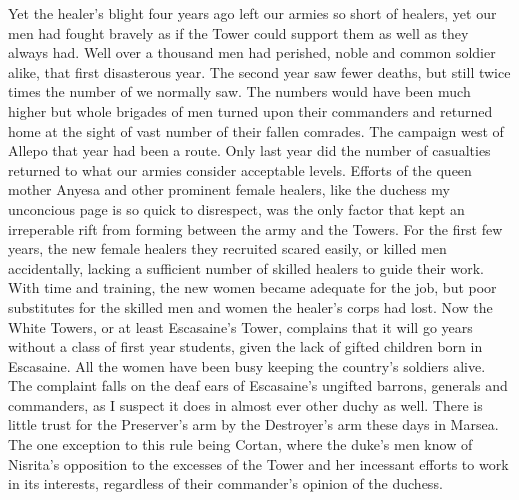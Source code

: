 \documentclass{article}
\begin{document}
Yet the healer's blight four years ago left our armies so short of healers, yet our men had fought bravely as if the Tower could support them as well as they always had. Well over a thousand men had perished, noble and common soldier alike, that first disasterous year. The second year saw fewer deaths, but still twice times the number of we normally saw. The numbers would have been much higher but whole brigades of men turned upon their commanders and returned home at the sight of vast number of their fallen comrades. The campaign west of Allepo that year had been a route. Only last year did the number of casualties returned to what our armies consider acceptable levels. Efforts of the queen mother Anyesa and other prominent female healers, like the duchess my unconcious page is so quick to disrespect, was the only factor that kept an irreperable rift from forming between the army and the Towers. For the first few years, the new female healers they recruited scared easily, or killed men accidentally, lacking a sufficient number of skilled healers to guide their work. With time and training, the new women became adequate for the job, but poor substitutes for the skilled men and women the healer's corps had lost. Now the White Towers, or at least Escasaine's Tower, complains that it will go years without a class of first year students, given the lack of gifted children born in Escasaine. All the women have been busy keeping the country's soldiers alive. The complaint falls on the deaf ears of Escasaine's ungifted barrons, generals and commanders, as I suspect it does in almost ever other duchy as well. There is little trust for the Preserver's arm by the Destroyer's arm these days in Marsea. The one exception to this rule being Cortan, where the duke's men know of Nisrita's opposition to the excesses of the Tower and her incessant efforts to work in its interests, regardless of their commander's opinion of the duchess.
\end{document}
